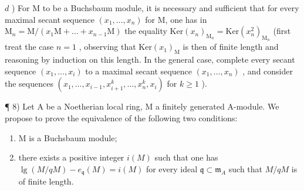 \(d\) ) For M to be a Buchsbaum module, it is necessary and sufficient that for every maximal secant sequence \((x_{1},\ldots ,x_{n})\) for M, one has in \(\mathrm{M}_n = \mathrm{M} / (x_1\mathrm{M} + \dots +x_{n - 1}\mathrm{M})\) the equality \(\mathrm{Ker}(x_n)_{\mathrm{M}_n} = \mathrm{Ker}(x_n^2)_{\mathrm{M}_n}\) (first treat the case \(n = 1\) , observing that \(\mathrm{Ker}(x_1)_{\mathrm{M}}\) is then of finite length and reasoning by induction on this length. In the general case, complete every secant sequence \((x_{1},\ldots ,x_{i})\) to a maximal secant sequence \((x_{1},\ldots ,x_{n})\) , and consider the sequences \((x_{1},\ldots ,x_{i - 1},x_{i + 1}^{k},\ldots ,x_{n}^{k},x_{i})\) for \(k\geqslant 1\) ).

¶ 8) Let A be a Noetherian local ring, M a finitely generated A-module. We propose to prove the equivalence of the following two conditions:

\begin{enumerate}
\def\labelenumi{(\roman{enumi})}
\item
  M is a Buchsbaum module;
\item
  there exists a positive integer \(i(M)\) such that one has \(\lg(M/qM)-e_{\mathfrak{q}}(M)=i(M)\) for every ideal \(\mathfrak{q}\subset\mathfrak{m}_{A}\) such that \(M/qM\) is of finite length.
\end{enumerate}


